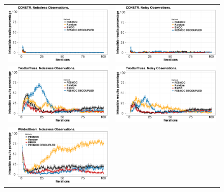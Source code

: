 \documentclass[review,preprint,12pt]{elsarticle}
\begin{document}
\begin{figure}[htb]
        \begin{tabular}{cc}
                \vspace{-.2cm}
                \includegraphics[width=0.475\linewidth]{../figures/benchmark/CONSTR_zeros_noiseless} &
                \includegraphics[width=0.475\linewidth]{../figures/benchmark/CONSTR_zeros_noisy} \\
                \includegraphics[width=0.475\linewidth]{../figures/benchmark/TwoBarTruss_zeros_noiseless} &
                \includegraphics[width=0.475\linewidth]{../figures/benchmark/TwoBarTruss_zeros_noisy} \\
                \includegraphics[width=0.475\linewidth]{../figures/benchmark/WeldedBeam_zeros_noiseless} &

\end{tabular}
\end{figure}
\end{document}
